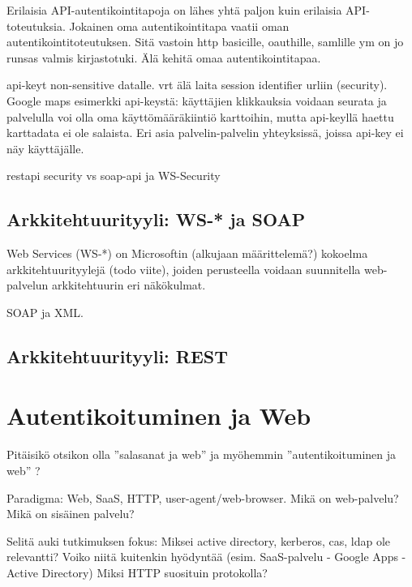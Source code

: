\documentclass[finnish,gradu]{tktltiki}
\begin{document}
  Erilaisia API-autentikointitapoja on lähes yhtä paljon kuin erilaisia API-toteutuksia. Jokainen oma autentikointitapa vaatii oman autentikointitoteutuksen. Sitä vastoin http basicille, oauthille, samlille ym on jo runsas valmis kirjastotuki.  Älä kehitä omaa autentikointitapaa.

  api-keyt non-sensitive datalle. vrt älä laita session identifier urliin (security). Google maps esimerkki api-keystä: käyttäjien klikkauksia voidaan seurata ja palvelulla voi olla oma käyttömääräkiintiö karttoihin, mutta api-keyllä haettu karttadata ei ole salaista. Eri asia palvelin-palvelin yhteyksissä, joissa api-key ei näy käyttäjälle.

  restapi security vs soap-api ja WS-Security


  \subsection{Arkkitehtuurityyli: WS-* ja SOAP} %
  \label{sub:arkkitehtuurityyli_ws_}
    Web Services (WS-*) on Microsoftin (alkujaan määrittelemä?) kokoelma arkkitehtuurityylejä (todo viite), joiden perusteella voidaan suunnitella web-palvelun arkkitehtuurin eri näkökulmat.

    SOAP ja XML.

  \subsection{Arkkitehtuurityyli: REST} %
  \label{sub:arkkitehtuurityyli_rest}




\section{Autentikoituminen ja Web} %
\label{sec:autentikoituminen_ja_web}

  Pitäisikö otsikon olla ''salasanat ja web'' ja myöhemmin ''autentikoituminen ja web'' ?

  Paradigma: Web, SaaS, HTTP, user-agent/web-browser.
  Mikä on web-palvelu?
  Mikä on sisäinen palvelu?

  Selitä auki tutkimuksen fokus:
  Miksei active directory, kerberos, cas, ldap ole relevantti?
  Voiko niitä kuitenkin hyödyntää (esim. SaaS-palvelu - Google Apps - Active Directory)
  Miksi HTTP suosituin protokolla?
\end{document}

